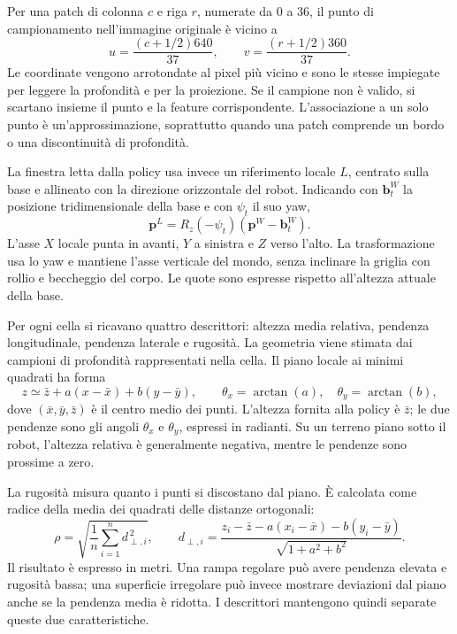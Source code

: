 Per una patch di colonna $c$ e riga $r$, numerate da 0 a 36, il punto di campionamento nell'immagine originale è vicino a
\[
    u=\frac{(c+1/2)640}{37},\qquad
    v=\frac{(r+1/2)360}{37}.
\]
Le coordinate vengono arrotondate al pixel più vicino e sono le stesse impiegate per leggere la profondità e per la proiezione. Se il campione non è valido, si scartano insieme il punto e la feature corrispondente. L'associazione a un solo punto è un'approssimazione, soprattutto quando una patch comprende un bordo o una discontinuità di profondità.

La finestra letta dalla policy usa invece un riferimento locale $L$, centrato sulla base e allineato con la direzione orizzontale del robot. Indicando con $\mathbf b_t^W$ la posizione tridimensionale della base e con $\psi_t$ il suo yaw,
\begin{equation}
    \mathbf p^L=R_z(-\psi_t)
                       (\mathbf p^W-\mathbf b_t^W).
    \label{eq:metodo-riferimento-mappa}
\end{equation}
L'asse $X$ locale punta in avanti, $Y$ a sinistra e $Z$ verso l'alto. La trasformazione usa lo yaw e mantiene l'asse verticale del mondo, senza inclinare la griglia con rollio e beccheggio del corpo. Le quote sono espresse rispetto all'altezza attuale della base.

Per ogni cella si ricavano quattro descrittori: altezza media relativa, pendenza longitudinale, pendenza laterale e rugosità. La geometria viene stimata dai campioni di profondità rappresentati nella cella. Il piano locale ai minimi quadrati ha forma
\begin{equation}
    z\simeq\bar z+a(x-\bar x)+b(y-\bar y),
    \qquad \theta_x=\arctan(a),\quad \theta_y=\arctan(b),
    \label{eq:metodo-piano-terreno}
\end{equation}
dove $(\bar x,\bar y,\bar z)$ è il centro medio dei punti. L'altezza fornita alla policy è $\bar z$; le due pendenze sono gli angoli $\theta_x$ e $\theta_y$, espressi in radianti. Su un terreno piano sotto il robot, l'altezza relativa è generalmente negativa, mentre le pendenze sono prossime a zero.

La rugosità misura quanto i punti si discostano dal piano. È calcolata come radice della media dei quadrati delle distanze ortogonali:
\begin{equation}
    \rho=\sqrt{\frac{1}{n}\sum_{i=1}^{n}d_{\perp,i}^{\,2}},
    \qquad
    d_{\perp,i}=\frac{z_i-\bar z-a(x_i-\bar x)-b(y_i-\bar y)}
                         {\sqrt{1+a^2+b^2}}.
    \label{eq:metodo-rugosita}
\end{equation}
Il risultato è espresso in metri. Una rampa regolare può avere pendenza elevata e rugosità bassa; una superficie irregolare può invece mostrare deviazioni dal piano anche se la pendenza media è ridotta. I descrittori mantengono quindi separate queste due caratteristiche.

